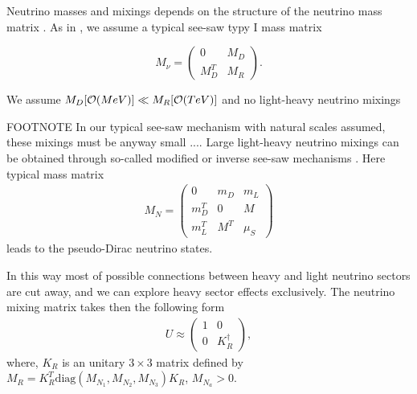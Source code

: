 \documentclass[twocolumn,superscriptaddress,showpacs,prl,nofootinbib,floatfix]{revtex4}
\begin{document}

Neutrino masses and mixings depends on the structure of the neutrino mass matrix 
\cite{Bilenky:1987ty}. As in \cite{Gluza:2015goa}, we assume a typical see-saw typy I mass matrix

\begin{equation}
M_{\nu}=\left(
\begin{array}{cc}
0 & M_D\\
M_D^T & M_R
\end{array}\right). \label{massm}
\end{equation}


We assume $M_D [{\cal{O}}(MeV)] \ll M_R [{\cal{O}}(TeV)]$ and  no light-heavy neutrino mixings

FOOTNOTE
In our typical see-saw mechanism with natural scales assumed, these mixings must be anyway small \cite{Gluza:2002vs,Chen:2011hc}.... Large light-heavy neutrino mixings can be obtained through so-called modified or inverse see-saw mechanisms \cite{Mohapatra:1986aw,Chen:2013foz,Deppisch:2015cua}.  Here typical mass matrix 
\begin{eqnarray}
        M_N  =  
 \left( \begin{matrix}
    0              & m_D         & m_L\\
                m^T_D        & 0           & M \\
                m^T_L      & M^T   & \mu_S
        \end{matrix} \right)
\label{eq:mtot}       
\end{eqnarray}
leads to the pseudo-Dirac neutrino states.


In this way most of possible connections between heavy and light neutrino sectors are cut away, and we can explore heavy sector effects exclusively.
The neutrino mixing matrix takes then the following form  \cite{Gluza:2015goa}  
\begin{eqnarray}\label{V}
U\approx\left(
\begin{array}{cc}
1 
& 
0\\
0 & K_{R}^\dag
\end{array}\right),
\end{eqnarray}
where, $K_{R}$ is an unitary $3\times3$ matrix defined by $M_R=K_{R}^T\mathrm{diag}(M_{N_1},M_{N_2},M_{N_3})K_{R}$, $M_{N_a}>0$.  
\end{document}
